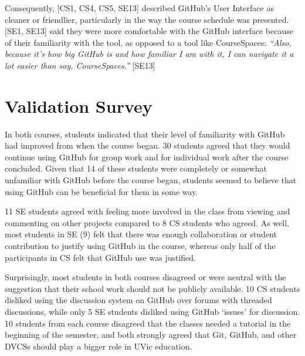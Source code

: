 Consequently, [CS1, CS4, CS5, SE13] described GitHub's User Interface as cleaner or friendlier, particularly in the way the course schedule was presented. [SE1, SE13] said they were more comfortable with the GitHub interface because of their familiarity with the tool, as opposed to a tool like CourseSpaces: \textit{``Also, because it's how big GitHub is and how familiar I am with it, I can navigate it a lot easier than say, CourseSpaces.''} [SE13]


\section{Validation Survey}
In both courses, students indicated that their level of familiarity with GitHub had improved from when the course began. 30 students agreed that they would continue using GitHub for group work and for individual work after the course concluded. Given that 14 of these students were completely or somewhat unfamiliar with GitHub before the course began, students seemed to believe that using GitHub can be beneficial for them in some way.

11 SE students agreed with feeling more involved in the class from viewing and commenting on other projects compared to 8 CS students who agreed. As well, most students in SE (9) felt that there was enough collaboration or student contribution to justify using GitHub in the course, whereas only half of the participants in CS felt that GitHub use was justified.

Surprisingly, most students in both courses disagreed or were neutral with the suggestion that their school work should not be publicly available. 10 CS students disliked using the discussion system on GitHub over forums with threaded discussions, while only 5 SE students disliked using GitHub `issues' for discussion. 10 students from each course disagreed that the classes needed a tutorial in the beginning of the semester, and both strongly agreed that Git, GitHub, and other DVCSs should play a bigger role in UVic education.

